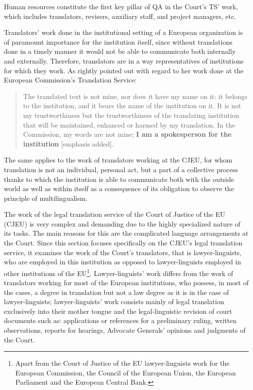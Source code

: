 \documentclass[output=paper]{langsci/langscibook}
\begin{document}
Human resources constitute the first key pillar of QA in the Court’s TS’ work, which includes translators, revisers, auxiliary staff, and project managers, etc.

Translators’ work done in the institutional setting of a European organization is of paramount importance for the institution itself, since without translations done in a timely manner it would not be able to communicate both internally and externally. Therefore, translators are in a way representatives of institutions for which they work. As \citet[24]{Koskinen2008} rightly pointed out with regard to her work done at the European Commission’s Translation Service:

\begin{quote}
The translated text is not mine, nor does it have my name on it: it belongs to the institution, and it bears the name of the institution on it. It is not my trustworthiness but the trustworthiness of the translating institution that will be maintained, enhanced or harmed by my translation. In the Commission, my words are not mine; \textbf{I am a spokesperson for the institution} [emphasis added].
\end{quote}

The same applies to the work of translators working at the CJEU, for whom translation is not an individual, personal act, but a part of a collective process thanks to which the institution is able to communicate both with the outside world as well as within itself as a consequence of its obligation to observe the principle of multilingualism.

The work of the legal translation service of the Court of Justice of the EU (CJEU) is very complex and demanding due to the highly specialized nature of its tasks. The main reasons for this are the complicated language arrangements at the Court. Since this section focuses specifically on the CJEU’s legal translation service, it examines the work of the Court’s translators, that is lawyer-linguists, who are employed in this institution as opposed to lawyer-linguists employed in other institutions of the EU\footnote{Apart from the Court of Justice of the EU lawyer-linguists work for the European Commission, the Council of the European Union, the European Parliament and the European Central Bank.}. Lawyer-linguists’ work differs from the work of translators working for most of the European institutions, who possess, in most of the cases, a degree in translation but not a law degree as it is in the case of lawyer-linguists; lawyer-linguists’ work consists mainly of legal translation exclusively into their mother tongue \citep[15]{McAuliffe2016} and the legal-linguistic revision of court documents such as: applications or references for a preliminary ruling, written observations, reports for  hearings, Advocate Generals’ opinions and judgments of the Court.
\end{document}
